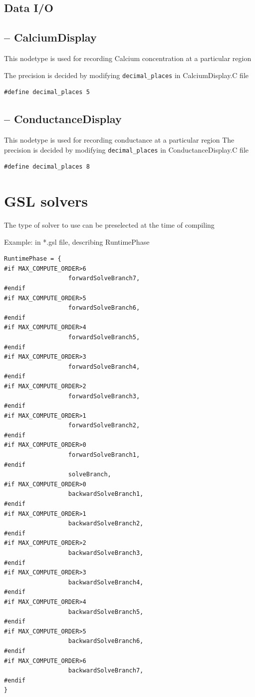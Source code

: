 \subsection{Data I/O}
\subsection{-- CalciumDisplay}
\label{sec:CalciumDisplay}

This nodetype is used for recording Calcium concentration at a particular region

The precision is decided by modifying \verb!decimal_places! in CalciumDisplay.C
file

\begin{verbatim}
#define decimal_places 5
\end{verbatim}

\subsection{-- ConductanceDisplay}
\label{sec:ConductanceDisplay}

This nodetype is used for recording conductance at a particular region
The precision is decided by modifying \verb!decimal_places! in
ConductanceDisplay.C file

\begin{verbatim}
#define decimal_places 8
\end{verbatim}

\section{GSL solvers}
\label{sec:GSL-solvers}

The type of solver to use can be preselected at the time of compiling

Example: in *.gsl file, describing RuntimePhase
\begin{verbatim}
RuntimePhase = {
#if MAX_COMPUTE_ORDER>6
                  forwardSolveBranch7,
#endif
#if MAX_COMPUTE_ORDER>5  
                  forwardSolveBranch6,
#endif
#if MAX_COMPUTE_ORDER>4
                  forwardSolveBranch5,
#endif
#if MAX_COMPUTE_ORDER>3
                  forwardSolveBranch4,
#endif
#if MAX_COMPUTE_ORDER>2
                  forwardSolveBranch3,
#endif
#if MAX_COMPUTE_ORDER>1
                  forwardSolveBranch2,
#endif
#if MAX_COMPUTE_ORDER>0 
                  forwardSolveBranch1,
#endif
                  solveBranch, 
#if MAX_COMPUTE_ORDER>0 
                  backwardSolveBranch1,
#endif
#if MAX_COMPUTE_ORDER>1
                  backwardSolveBranch2,
#endif  
#if MAX_COMPUTE_ORDER>2
                  backwardSolveBranch3,
#endif
#if MAX_COMPUTE_ORDER>3
                  backwardSolveBranch4,
#endif
#if MAX_COMPUTE_ORDER>4
                  backwardSolveBranch5,
#endif
#if MAX_COMPUTE_ORDER>5
                  backwardSolveBranch6,
#endif
#if MAX_COMPUTE_ORDER>6
                  backwardSolveBranch7,
#endif
}
\end{verbatim}


